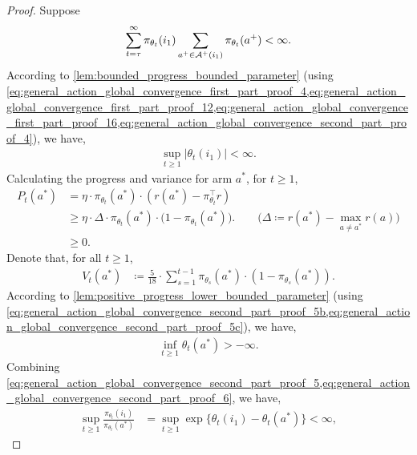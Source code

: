 \begin{proof}
Suppose
\begin{align}
\label{eq:general_action_global_convergence_second_part_proof_4}
    \sum_{t=\tau}^{\infty} \pi_{\theta_t}(i_1) \sum_{a^+ \in {\mathcal{A}}^+(i_1)}{ \pi_{\theta_t}(a^+) } < \infty.
\end{align}
According to \cref{lem:bounded_progress_bounded_parameter} (using \cref{eq:general_action_global_convergence_first_part_proof_4,eq:general_action_global_convergence_first_part_proof_12,eq:general_action_global_convergence_first_part_proof_16,eq:general_action_global_convergence_second_part_proof_4}), we have,
\begin{align}
\label{eq:general_action_global_convergence_second_part_proof_5}
    \sup_{t \ge 1}{ |\theta_t(i_1)| } < \infty.
\end{align}
Calculating the progress and variance for arm $a^*$, for $t \geq 1$, 
\begin{align}
\label{eq:general_action_global_convergence_second_part_proof_5b}
    P_t(a^*) &= \eta \cdot \pi_{\theta_t}(a^*) \cdot (r(a^*) -  \pi_{\theta_t}^\top r ) \\
    &\geq \eta \cdot \Delta \cdot \pi_{\theta_t}(a^*) \cdot \big( 1 - \pi_{\theta_t}(a^*) \big). \qquad \big( \Delta \coloneqq r(a^*) - \max_{a \neq a^*}{r(a)} \big) \\
    &\ge 0.
\end{align}
Denote that, for all $t 
\ge 1$, 
\begin{align}
\label{eq:general_action_global_convergence_second_part_proof_5c}
    V_t(a^*) &\coloneqq \frac{5}{18} \cdot \sum_{s=1}^{t-1}  \pi_{\theta_s}(a^*) \cdot (1-\pi_{\theta_s}(a^*)).
\end{align}
According to \cref{lem:positive_progress_lower_bounded_parameter} (using \cref{eq:general_action_global_convergence_second_part_proof_5b,eq:general_action_global_convergence_second_part_proof_5c}), we have,
\begin{align}
\label{eq:general_action_global_convergence_second_part_proof_6}
    \inf_{t \ge 1}{\theta_t(a^*)} > -\infty.
\end{align}
Combining \cref{eq:general_action_global_convergence_second_part_proof_5,eq:general_action_global_convergence_second_part_proof_6}, we have,
\begin{align}
\label{eq:general_action_global_convergence_second_part_proof_7}
    \sup_{t \ge 1}{ \frac{\pi_{\theta_t}(i_1)}{\pi_{\theta_t}(a^*)}} &= \sup_{t \ge 1} {\exp\{ \theta_t(i_1) - \theta_t(a^*) \}} < \infty,
\end{align}

\end{proof}
